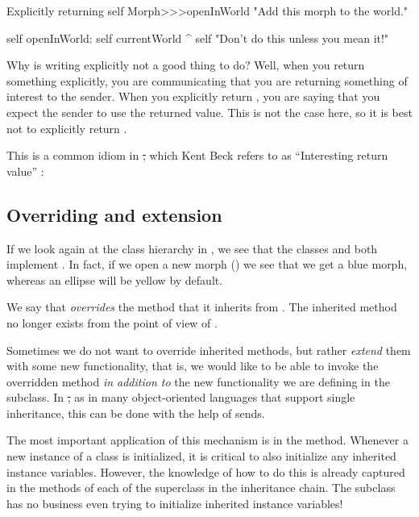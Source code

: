 \documentclass[a4paper,10pt,twoside]{book}
\begin{document}
\begin{method}[openInWorldReturnSelf]{Explicitly returning self}
Morph>>>openInWorld
	"Add this morph to the world."
	
    self openInWorld: self currentWorld
	^ self		"Don't do this unless you mean it!"
\end{method}

Why is writing  explicitly not a good thing to do?
Well, when you return something explicitly, you are communicating that you are returning something of interest to the sender.
When you explicitly return \self, you are saying that you expect the sender to use the returned value.
This is not the case here, so it is best not to explicitly return \self.

This is a common idiom in \st, which Kent Beck refers to as ``Interesting return value'' \cite{Beck97a}:


\subsection{Overriding and extension}

If we look again at the  class hierarchy in , we see that the classes  and \mbox{} both implement .
In fact, if we open a new morph () we see that we get a blue morph, whereas an ellipse will be yellow by default.

We say that  \emph{overrides} the  method that it inherits from .
The inherited method no longer exists from the point of view of .

Sometimes we do not want to override inherited methods, but rather \emph{extend} them with some new functionality, that is, we would like to be able to invoke the overridden method \emph{in addition to} the new functionality we are defining in the subclass.
In \st, as in many object-oriented languages that support single inheritance, this can be done with the help of \super sends.

The most important application of this mechanism is in the  method.
Whenever a new instance of a class is initialized, it is critical to also initialize any inherited instance variables.
However, the knowledge of how to do this is already captured in the  methods of each of the superclass in the inheritance chain.
The subclass has no business even trying to initialize inherited instance variables!
\end{document}
